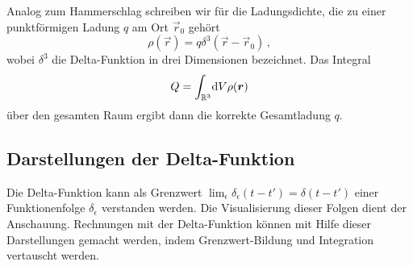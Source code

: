 \documentclass[paper=a4, fontsize=11.0pt, abstractoff, DIV12]{scrartcl}
\begin{document}
Analog zum Hammerschlag schreiben wir für die Ladungsdichte, die zu einer
punktförmigen Ladung $q$ am Ort $\vec r_0$ gehört
\begin{equation}
\rho(\vec r) = q \delta^3(\vec r - \vec r_0)\,,
\end{equation}
wobei $\delta^3$ die Delta-Funktion in drei Dimensionen bezeichnet. Das
Integral
\begin{equation}
Q = \int_{\mathbb{R}^3}\!\mathrm{d} V \rho({\boldsymbol{r}})
\end{equation}
über den gesamten Raum ergibt dann die korrekte Gesamtladung $q$.

\subsection{Darstellungen der Delta-Funktion}

Die Delta-Funktion kann als Grenzwert $\lim_{\epsilon}\delta_\epsilon(t -
t') = \delta(t-t')$ einer Funktionenfolge $\delta_\epsilon$ verstanden
werden. Die Visualisierung dieser Folgen dient der Anschauung. Rechnungen mit
der Delta-Funktion können mit Hilfe dieser Darstellungen gemacht werden,
indem Grenzwert-Bildung und Integration vertauscht werden.
\end{document}
